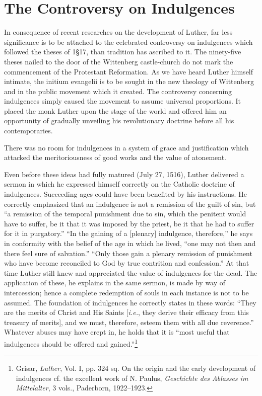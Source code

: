 \section{The Controversy on Indulgences}

In consequence of recent researches on the development of Luther,
far less significance is to be attached to the celebrated controversy
on indulgences which followed the theses of 1§17, than tradition
has ascribed to it. The ninety-five theses nailed to the door of the
Wittenberg castle-church do not mark the commencement of the
Protestant Reformation. As we have heard Luther himself intimate,
the initium evangelii is to be sought in the new theology of Wittenberg
and in the public movement which it created. The controversy
concerning indulgences simply caused the movement to assume universal proportions.
It placed the monk Luther upon the stage of
the world and offered him an opportunity of gradually unveiling
his revolutionary doctrine before all his contemporaries.

There was no room for indulgences in a system of grace and
justification which attacked the meritoriousness of good works and
the value of atonement.

Even before these ideas had fully matured (July 27, 1516), Luther
delivered a sermon in which he expressed himself correctly on the
Catholic doctrine of indulgences. Succeeding ages could have been
benefited by his instructions. He correctly emphasized that an indulgence
is not a remission of the guilt of sin, but “a remission of
the temporal punishment due to sin, which the penitent would have
to suffer, be it that it was imposed by the priest, be it that he had
to suffer for it in purgatory.” “In the gaining of a [plenary] indulgence,
therefore,” he says in conformity with the belief of the
age in which he lived, “one may not then and there feel sure of
salvation.” “Only those gain a plenary remission of punishment who
have become reconciled to God by true contrition and confession.”
At that time Luther still knew and appreciated the value of indulgences
for the dead. The application of these, he explains in the same
sermon, is made by way of intercession; hence a complete redemption of
souls in each instance is not to be assumed. The foundation
of indulgences he correctly states in these words: “They are the
merits of Christ and His Saints [\textit{i.e.}, they derive their efficacy from
this treasury of merits], and we must, therefore, esteem them with
all due reverence.” Whatever abuses may have crept in, he holds
that it is “most useful that indulgences should be offered and
gained.”\footnote
{Grisar, \textit{Luther}, Vol. I, pp. 324 sq. On the origin and the early development of indulgences
cf. the excellent work of N. Paulus, \textit{Geschichte des Ablasses im Mittelalter}, 3 vols.,
Paderborn, 1922--1923.}

